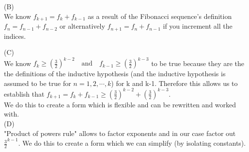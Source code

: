 \documentclass[solution,letterpaper]{cs20}
\begin{document}
\begin{problem}
\begin{solution}
        (B) \\
        We know $f_{k+1} = f_k + f_{k-1}$ as a result of the Fibonacci sequence's definition $f_n = f_{n-1} + f_{n-2}$ or alternatively $f_{n+1} = f_{n} + f_{n-1}$ if you increment all the indices.

        (C) \\
        We know $ f_k \ge \left( \frac{3}{2} \right)^{k-2} \quad \text{and} \quad f_{k-1} \ge \left( \frac{3}{2} \right)^{k-3} $ to be true because they are the the definitions of the inductive hypothesis (and the inductive hypothesis is assumed to be true for $n = 1, 2, \cdots, k$) for k and k-1. Therefore this allows us to establish that $f_{k+1} = f_k + f_{k-1} \ge \left( \frac{3}{2} \right)^{k-2} + \left( \frac{3}{2} \right)^{k-3}$. \\
        We do this to create a form which is flexible and can be rewritten and worked with. \\

        (D) \\
        "Product of powers rule" allows to factor exponents and in our case factor out $\frac{3}{2}^{k - 1}$. We do this to create a form which we can simplify (by isolating constants).
        \end{solution}
    \end{problem}


    \newpage
\end{document}
